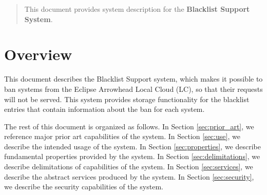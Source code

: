 \documentclass[a4paper]{arrowhead}
\begin{document}
\ArrowheadDate{\today}
\ArrowheadSetup

\begin{center}
  \vspace*{1cm}
  \huge{\arrowtitle}

  \vspace*{0.2cm}
  \LARGE{\arrowtype}
  \vspace*{1cm}

  \vspace*{\fill}


  \vspace*{1cm}
  \vspace*{\fill}

  \begin{abstract}
    This document provides system description for the \textbf{Blacklist Support System}.
  \end{abstract}

  \vspace*{1cm}

 \end{center}

\newpage

\tableofcontents
\newpage

\section{Overview}
\label{sec:overview}
\color{black}
This document describes the Blacklist Support system, which makes it possible to ban systems from the Eclipse Arrowhead Local Cloud (LC), so that their requests will not be served. This system provides storage functionality for the blacklist entries that contain information about the ban for each system.

The rest of this document is organized as follows.
In Section \ref{sec:prior_art}, we reference major prior art capabilities
of the system.
In Section \ref{sec:use}, we describe the intended usage of the system.
In Section \ref{sec:properties}, we describe fundamental properties
provided by the system.
In Section \ref{sec:delimitations}, we describe delimitations of capabilities
of the system.
In Section \ref{sec:services}, we describe the abstract services produced by the system.
In Section \ref{sec:security}, we describe the security capabilities
of the system.
\end{document}
